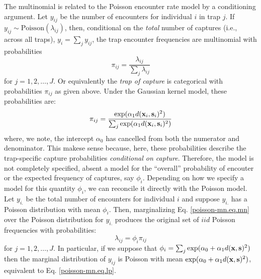 The multinomial is related to the Poisson encounter rate
model by a conditioning argument. Let $y_{ij}$ be the number of
encounters for individual $i$ in trap $j$. If $y_{ij} \sim
\mbox{Poisson}(\lambda_{ij})$,
then,
conditional on the {\it total}
number of captures (i.e., across all traps), $y_{i} = \sum_{j}
y_{ij}$, the trap encounter frequencies are multinomial with
probabilities
\[
 \pi_{ij} =  \frac{ \lambda_{ij} } { \sum_{j} \lambda_{ij} }
\]
for $j=1,2,\ldots,J$.
Or equivalently the {\it trap of
  capture} is categorical with probabilities $\pi_{ij}$ as given above.
Under the Gaussian kernel model, these probabilities are:
\begin{equation}
\pi_{ij} =  \frac{ \exp(  \alpha_{1}  d({\bf x}_{i},{\bf s}_{i})^2 ) }  {
   \sum_{j} \exp( \alpha_{1} d({\bf x}_{i},{\bf s}_{i})^2)}
\label{poisson-mn.eq.mnprobs}
\end{equation}
where, we note, the intercept $\alpha_{0}$ has cancelled from both the
numerator and denominator. This makese sense because, here, these
probabilities describe the trap-specific capture probabilities {\it
  conditional on capture}.  Therefore, the model is not completely
specified, absent a model for the ``overall'' probability of encouter
or the expected frequency of captures, say $\phi_{i}$. Depending on
how we specify a model for this quantity $\phi_{i}$, we can reconcile
it directly with the Poisson model.
Let $y_{i.}$ be the total number of encounters for individual $i$ and
suppose $y_{i.}$ has a Poisson distribution with mean $\phi_{i}$.
Then, marginalizing Eq. \ref{poisson-mn.eq.mn} over the Poisson
distribution for $y_{i.}$ produces the original set of $iid$ Poisson
frequencies with probabilities:
\[
 \lambda_{ij} = \phi_{i} \pi_{ij}
\]
for $j=1,2,\ldots,J$.
In particular, if we suppose that
$\phi_{i} = \sum_{j} \exp(\alpha_{0} + \alpha_{1} d({\bf x},{\bf s})^2)$
then the marginal distribution of $y_{ij}$ is Poisson with mean $\exp(
\alpha_{0} + \alpha_{1} d({\bf x},{\bf s})^2 )$, equivalent to
Eq. \ref{poisson-mn.eq.lp}.


